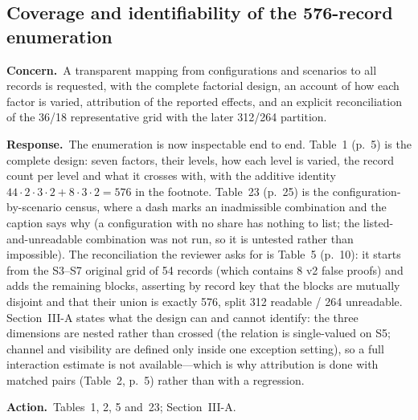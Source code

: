 \documentclass[10pt,letterpaper]{article}
\newcommand{\Concern}[1]{\par\smallskip\noindent\textbf{Concern.}\ #1\par}
\newcommand{\Response}[1]{\par\smallskip\noindent\textbf{Response.}\ #1\par}
\newcommand{\Action}[1]{\par\smallskip\noindent\textbf{Action.}\ #1\par}
\begin{document}
\subsection{Coverage and identifiability of the 576-record enumeration}
\Concern{A transparent mapping from configurations and scenarios to all records
is requested, with the complete factorial design, an account of how each factor is
varied, attribution of the reported effects, and an explicit reconciliation of the
36/18 representative grid with the later 312/264 partition.}
\Response{The enumeration is now inspectable end to end. Table~1 (p.~5) is the
complete design: seven factors, their levels, how each level is varied, the record
count per level and what it crosses with, with the additive identity
$44\cdot2\cdot3\cdot2+8\cdot3\cdot2=576$ in the footnote. Table~23 (p.~25) is the
configuration-by-scenario census, where a dash marks an inadmissible combination
and the caption says why (a configuration with no share has nothing to list; the
listed-and-unreadable combination was not run, so it is untested rather than
impossible). The reconciliation the reviewer asks for
is Table~5 (p.~10): it starts from the S3--S7 original grid of 54 records
(which contains 8 v2 false proofs) and adds the remaining blocks, asserting by
record key that the blocks are mutually disjoint and that their union is exactly
576, split 312 readable / 264 unreadable. Section~III-A states what the design
can and cannot identify: the three dimensions are nested rather than crossed (the
relation is single-valued on S5; channel and visibility are defined only inside
one exception setting), so a full interaction estimate is not available---which is
why attribution is done with matched pairs (Table~2, p.~5) rather than with a
regression.}
\Action{Tables~1, 2, 5 and~23; Section~III-A.}
\end{document}
